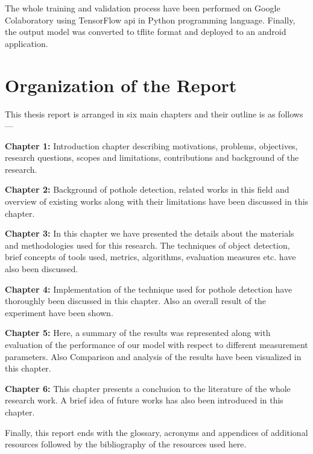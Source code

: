     The whole training and validation process have been performed on Google Colaboratory using TensorFlow\cite{dillon2017tensorflow} \acrshort{api} in Python programming language. Finally, the output model was converted to \gls{tflite} format and deployed to an android application.
    
\section{Organization of the Report}
    This thesis report is arranged in six main chapters and their outline is as follows---
    
    \vspace{3mm}\textbf{Chapter 1:} Introduction chapter describing motivations, problems, objectives, research questions, scopes and limitations, contributions and background of the research.
    
    \vspace{3mm}\textbf{Chapter 2:} Background of pothole detection, related works in this field and overview of existing works along with their limitations have been discussed in this chapter.
    
    \vspace{3mm}\textbf{Chapter 3:} In this chapter we have presented the details about the materials and methodologies used for this research. The techniques of object detection, brief concepts of tools used, metrics, algorithms, evaluation measures etc. have also been discussed.
    
    \vspace{3mm}\textbf{Chapter 4:} Implementation of the technique used for pothole detection have thoroughly been discussed in this chapter. Also an overall result of the experiment have been shown.
    
    \vspace{3mm}\textbf{Chapter 5:} Here, a summary of the results was represented along with evaluation of the performance of our model with respect to different measurement parameters. Also Comparison and analysis of the results have been visualized in this chapter.
    
    \vspace{3mm}\textbf{Chapter 6:} This chapter presents a conclusion to the literature of the whole research work. A brief idea of future works has also been introduced in this chapter.
    
    \vspace{5mm} Finally, this report ends with the glossary, acronyms and appendices of additional resources followed by the bibliography of the resources used here.
